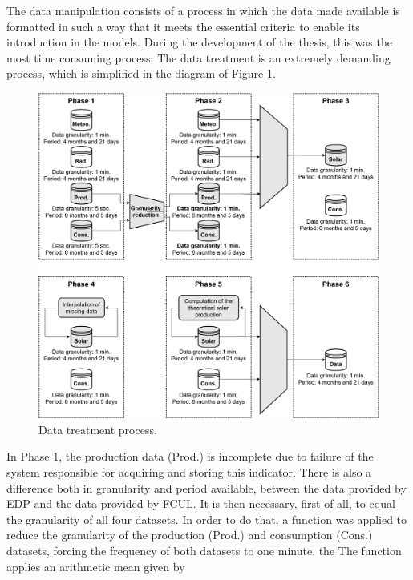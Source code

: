 The data manipulation consists of a process in which the data made available is formatted in such a way that it meets the essential criteria to enable its introduction in the models. During the development of the thesis, this was the most time consuming process. The data treatment is an extremely demanding process, which is simplified in the diagram of Figure \ref{datatreatment}.

\begin{figure}[h!]
    \centering
    \begin{center}
    \includegraphics[width=1\textwidth]{Images/Data.png}
    \caption{Data treatment process.}
    \label{datatreatment}
    \end{center}
\end{figure}

In Phase 1, the production data (Prod.) is incomplete due to failure of the system responsible for acquiring and storing this indicator. There is also a difference both in granularity and period available, between the data provided by \ac{EDP} and the data provided by \ac{FCUL}. It is then necessary, first of all, to equal the granularity of all four datasets. In order to do that, a function was applied to reduce the granularity of the production (Prod.) and consumption (Cons.) datasets, forcing the frequency of both datasets to one minute. the  The function applies an arithmetic mean given by 


